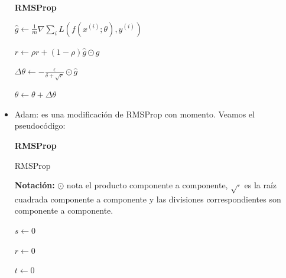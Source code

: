 \begin{itemize}
\begin{algorithm}[H]{\Large{\textbf{RMSProp}}}
{			$\hat{g} \leftarrow \frac{1}{m}\nabla \sum_{i} L(f(x^{(i)};\theta), y^{(i)})$
			
			$r\leftarrow \rho r + (1-\rho)\hat{g}\odot \hat{g}$
			
			$\Delta \theta \leftarrow - \frac{\epsilon}{\delta + \sqrt{r}} \odot \hat{g}$
			
			$\theta \leftarrow \theta + \Delta \theta$
			
		}
		
		\vspace{10px}
		
		
		\vspace{5px}
	\end{algorithm}

	\item Adam: es una modificación de RMSProp con momento. Veamos el pseudocódigo:
	
	\begin{algorithm}[H]{\Large{\textbf{RMSProp}}}
		
		\vspace{15px}
		
		\caption{RMSProp}
		\label{alg:rmsprop}
		\textbf{Notación:} $\odot$ nota el producto componente a componente, $\sqrt{\cdot}$ es la raíz cuadrada componente a componente y las divisiones correspondientes son componente a componente.
		
		\KwIn{Tasas de decaimiento $\rho_1 , \rho_2 \in [0,1)$}
		
		\vspace{10px}
		
		$s\leftarrow 0$
		
		$r\leftarrow 0$
		
		$t\leftarrow 0$
		
\end{algorithm}
\end{itemize}
